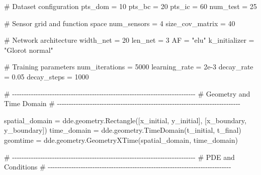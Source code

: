 \documentclass[
  spanish,
  us-letterpaper,
  DIV=11,
  numbers=noendperiod]{scrreprt}
\newenvironment{Shaded}{\begin{snugshade}}{\end{snugshade}}
\newcommand{\CommentTok}[1]{\textcolor[rgb]{0.37,0.37,0.37}{#1}}
\newcommand{\DecValTok}[1]{\textcolor[rgb]{0.68,0.00,0.00}{#1}}
\newcommand{\FloatTok}[1]{\textcolor[rgb]{0.68,0.00,0.00}{#1}}
\newcommand{\NormalTok}[1]{\textcolor[rgb]{0.00,0.23,0.31}{#1}}
\newcommand{\OperatorTok}[1]{\textcolor[rgb]{0.37,0.37,0.37}{#1}}
\newcommand{\StringTok}[1]{\textcolor[rgb]{0.13,0.47,0.30}{#1}}
\theoremstyle{definition}
\theoremstyle{plain}
\theoremstyle{remark}
\begin{document}
\begin{Shaded}
\begin{Highlighting}[]
\CommentTok{\# Dataset configuration}
\NormalTok{pts\_dom }\OperatorTok{=} \DecValTok{10}
\NormalTok{pts\_bc }\OperatorTok{=} \DecValTok{20}
\NormalTok{pts\_ic }\OperatorTok{=} \DecValTok{60}
\NormalTok{num\_test }\OperatorTok{=} \DecValTok{25}

\CommentTok{\# Sensor grid and function space}
\NormalTok{num\_sensors }\OperatorTok{=} \DecValTok{4}
\NormalTok{size\_cov\_matrix }\OperatorTok{=} \DecValTok{40}

\CommentTok{\# Network architecture}
\NormalTok{width\_net }\OperatorTok{=} \DecValTok{20}
\NormalTok{len\_net }\OperatorTok{=} \DecValTok{3}
\NormalTok{AF }\OperatorTok{=} \StringTok{"elu"}
\NormalTok{k\_initializer }\OperatorTok{=} \StringTok{"Glorot normal"}

\CommentTok{\# Training parameters}
\NormalTok{num\_iterations }\OperatorTok{=} \DecValTok{5000}
\NormalTok{learning\_rate }\OperatorTok{=} \FloatTok{2e{-}3}
\NormalTok{decay\_rate }\OperatorTok{=} \FloatTok{0.05}
\NormalTok{decay\_steps }\OperatorTok{=} \DecValTok{1000}

\CommentTok{\# {-}{-}{-}{-}{-}{-}{-}{-}{-}{-}{-}{-}{-}{-}{-}{-}{-}{-}{-}{-}{-}{-}{-}{-}{-}{-}{-}{-}{-}{-}{-}{-}{-}{-}{-}{-}{-}{-}{-}{-}{-}{-}{-}{-}{-}{-}{-}{-}{-}{-}{-}{-}{-}{-}{-}{-}{-}{-}{-}{-}{-}{-}{-}{-}{-}{-}{-}{-}{-}{-}{-}{-}{-}{-}{-}{-}{-}{-}}
\CommentTok{\# Geometry and Time Domain}
\CommentTok{\# {-}{-}{-}{-}{-}{-}{-}{-}{-}{-}{-}{-}{-}{-}{-}{-}{-}{-}{-}{-}{-}{-}{-}{-}{-}{-}{-}{-}{-}{-}{-}{-}{-}{-}{-}{-}{-}{-}{-}{-}{-}{-}{-}{-}{-}{-}{-}{-}{-}{-}{-}{-}{-}{-}{-}{-}{-}{-}{-}{-}{-}{-}{-}{-}{-}{-}{-}{-}{-}{-}{-}{-}{-}{-}{-}{-}{-}{-}}

\NormalTok{spatial\_domain }\OperatorTok{=}\NormalTok{ dde.geometry.Rectangle([x\_initial, y\_initial],}
\NormalTok{                                        [x\_boundary, y\_boundary])}
\NormalTok{time\_domain }\OperatorTok{=}\NormalTok{ dde.geometry.TimeDomain(t\_initial, t\_final)}
\NormalTok{geomtime }\OperatorTok{=}\NormalTok{ dde.geometry.GeometryXTime(spatial\_domain, time\_domain)}

\CommentTok{\# {-}{-}{-}{-}{-}{-}{-}{-}{-}{-}{-}{-}{-}{-}{-}{-}{-}{-}{-}{-}{-}{-}{-}{-}{-}{-}{-}{-}{-}{-}{-}{-}{-}{-}{-}{-}{-}{-}{-}{-}{-}{-}{-}{-}{-}{-}{-}{-}{-}{-}{-}{-}{-}{-}{-}{-}{-}{-}{-}{-}{-}{-}{-}{-}{-}{-}{-}{-}{-}{-}{-}{-}{-}{-}{-}{-}{-}{-}}
\CommentTok{\# PDE and Conditions}
\CommentTok{\# {-}{-}{-}{-}{-}{-}{-}{-}{-}{-}{-}{-}{-}{-}{-}{-}{-}{-}{-}{-}{-}{-}{-}{-}{-}{-}{-}{-}{-}{-}{-}{-}{-}{-}{-}{-}{-}{-}{-}{-}{-}{-}{-}{-}{-}{-}{-}{-}{-}{-}{-}{-}{-}{-}{-}{-}{-}{-}{-}{-}{-}{-}{-}{-}{-}{-}{-}{-}{-}{-}{-}{-}{-}{-}{-}{-}{-}{-}}


\end{Highlighting}
\end{Shaded}
\end{document}

